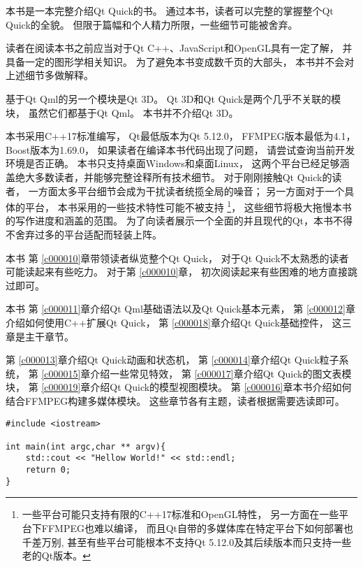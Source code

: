 本书是一本完整介绍Qt Quick的书。
通过本书，读者可以完整的掌握整个Qt Quick的全貌。
但限于篇幅和个人精力所限，一些细节可能被舍弃。

读者在阅读本书之前应当对于Qt C++、JavaScript和OpenGL具有一定了解，
并具备一定的图形学相关知识。
为了避免本书变成数千页的大部头，
本书并不会对上述细节多做解释。

基于Qt Qml的另一个模块是Qt 3D。
Qt 3D和Qt Quick是两个几乎不关联的模块，
虽然它们都基于Qt Qml。
本书并不介绍Qt 3D。

本书采用C++17标准编写，
Qt最低版本为Qt 5.12.0，
FFMPEG版本最低为4.1，
Boost版本为1.69.0，
如果读者在编译本书代码出现了问题，
请尝试查询当前开发环境是否正确。
本书只支持桌面Windows和桌面Linux，
这两个平台已经足够涵盖绝大多数读者，并能够完整诠释所有技术细节。
对于刚刚接触Qt Quick的读者，
一方面太多平台细节会成为干扰读者统揽全局的噪音；
另一方面对于一个具体的平台，
本书采用的一些技术特性可能不被支持
\footnote{
一些平台可能只支持有限的C++17标准和OpenGL特性，
另一方面在一些平台下FFMPEG也难以编译，
而且Qt自带的多媒体库在特定平台下如何部署也千差万别,
甚至有些平台可能根本不支持Qt 5.12.0及其后续版本而只支持一些老的Qt版本。
}，
这些细节将极大拖慢本书的写作进度和涵盖的范围。
为了向读者展示一个全面的并且现代的Qt，本书不得不舍弃过多的平台适配而轻装上阵。

本书
第 \ref{c000010}章带领读者纵览整个Qt Quick，
对于Qt Quick不太熟悉的读者可能读起来有些吃力。
对于第 \ref{c000010}章，
初次阅读起来有些困难的地方直接跳过即可。

本书
第 \ref{c000011}章介绍Qt Qml基础语法以及Qt Quick基本元素，
第 \ref{c000012}章介绍如何使用C++扩展Qt Quick，
第 \ref{c000018}章介绍Qt Quick基础控件，
这三章是主干章节。

第 \ref{c000013}章介绍Qt Quick动画和状态机，
第 \ref{c000014}章介绍Qt Quick粒子系统，
第 \ref{c000015}章介绍一些常见特效，
第 \ref{c000017}章介绍Qt Quick的图文表模块，
第 \ref{c000019}章介绍Qt Quick的模型视图模块。
第 \ref{c000016}章本书介绍如何结合FFMPEG构建多媒体模块。
这些章节各有主题，读者根据需要选读即可。

\begin{lstlisting}[label=f000000 
]
#include <iostream>

int main(int argc,char ** argv){
    std::cout << "Hellow World!" << std::endl;
    return 0;
}
\end{lstlisting}          %






















